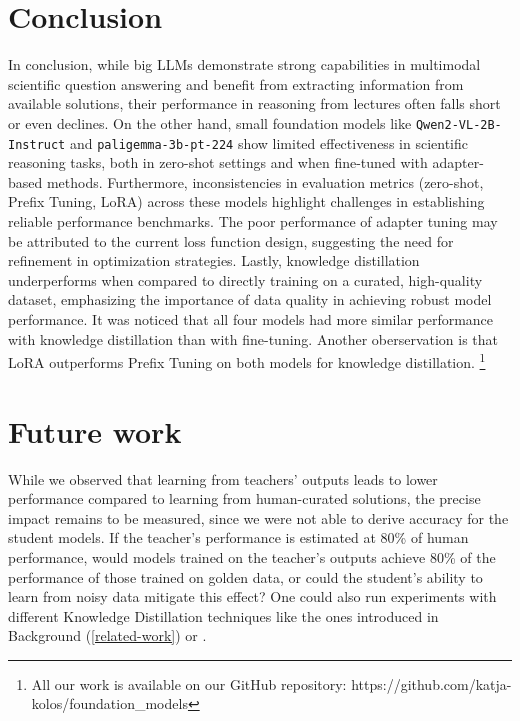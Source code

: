 \documentclass{article}
\begin{document}
\section{Conclusion}
\label{Conclusion}
In conclusion, while big LLMs demonstrate strong capabilities in multimodal scientific question answering and benefit from extracting information from available solutions, their performance in reasoning from lectures often falls short or even declines. On the other hand, small foundation models like \texttt{Qwen2-VL-2B-Instruct} and \texttt{paligemma-3b-pt-224} show limited effectiveness in scientific reasoning tasks, both in zero-shot settings and when fine-tuned with adapter-based methods. Furthermore, inconsistencies in evaluation metrics (zero-shot, Prefix Tuning, LoRA) across these models highlight challenges in establishing reliable performance benchmarks. The poor performance of adapter tuning may be attributed to the current loss function design, suggesting the need for refinement in optimization strategies. Lastly, knowledge distillation underperforms when compared to directly training on a curated, high-quality dataset, emphasizing the importance of data quality in achieving robust model performance. \newline
It was noticed that all four models had more similar performance with knowledge distillation than with fine-tuning. Another oberservation is that LoRA outperforms Prefix Tuning on both models for knowledge distillation.
\footnote{All our work is available on our GitHub repository: https://github.com/katja-kolos/foundation\_models}

\section{Future work}
\label{Future work}
While we observed that learning from teachers' outputs leads to lower performance compared to learning from human-curated solutions, the precise impact remains to be measured, since we were not able to derive accuracy for the student models. If the teacher's performance is estimated at 80\% of human performance, would models trained on the teacher's outputs achieve 80\% of the performance of those trained on golden data, or could the student's ability to learn from noisy data mitigate this effect?
One could also run experiments with different Knowledge Distillation techniques like the ones introduced in Background (\ref{related-work}) or \cite{gou2021knowledge}.

\end{document}
